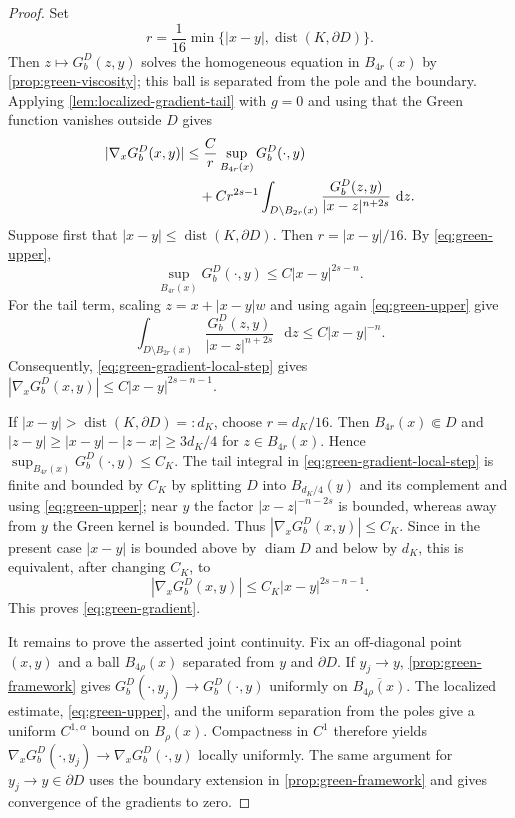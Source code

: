 \documentclass[10pt,a4paper]{amsart}
\numberwithin{equation}{section}
\newcommand{\differential}{\mathop{}\!\mathrm d}
\newcommand{\rev}[1]{#1}
\begin{document}
\begin{proof}
\rev{Set
\[
 r=\frac1{16}\min\{|x-y|,\operatorname{dist}(K,\partial D)\}.
\]
Then $z\mapsto G_b^D(z,y)$ solves the homogeneous equation in
$B_{4r}(x)$ by \cref{prop:green-viscosity}; this ball is separated from
the pole and the boundary.}  Applying \cref{lem:localized-gradient-tail} with $g=0$ and
using that the Green function vanishes outside $D$ gives
\begin{align}\label{eq:green-gradient-local-step}
 |\nabla_xG_b^D(x,y)|
 &\le \frac{C}{r}\sup_{B_{4r}(x)}G_b^D(\cdot,y)\notag\\
 &\quad+C r^{2s-1}
 \int_{D\setminus B_{2r}(x)}
 \frac{G_b^D(z,y)}{|x-z|^{n+2s}}\,\differential z.
\end{align}
Suppose first that $|x-y|\le\operatorname{dist}(K,\partial D)$.  Then
\rev{$r=|x-y|/16$}.  By \eqref{eq:green-upper},
\[
 \sup_{B_{4r}(x)}G_b^D(\cdot,y)\le C|x-y|^{2s-n}.
\]
For the tail term, scaling $z=x+|x-y|w$ and using again
\eqref{eq:green-upper} give
\[
 \int_{D\setminus B_{2r}(x)}
 \frac{G_b^D(z,y)}{|x-z|^{n+2s}}\,\differential z
 \le C|x-y|^{-n}.
\]
Consequently, \eqref{eq:green-gradient-local-step} gives
$|\nabla_xG_b^D(x,y)|\le C|x-y|^{2s-n-1}$.

If $|x-y|>\operatorname{dist}(K,\partial D)=:d_K$, choose
\rev{$r=d_K/16$}.  \rev{Then $B_{4r}(x)\Subset D$ and
$|z-y|\ge |x-y|-|z-x|\ge3d_K/4$ for $z\in B_{4r}(x)$.}  Hence
$\sup_{B_{4r}(x)}G_b^D(\cdot,y)\le C_K$.  The tail integral in
\eqref{eq:green-gradient-local-step} is finite and bounded by $C_K$ by
splitting $D$ into $B_{d_K/4}(y)$ and its complement and using
\eqref{eq:green-upper}; near $y$ the factor $|x-z|^{-n-2s}$ is bounded,
whereas away from $y$ the Green kernel is bounded.  Thus
$|\nabla_xG_b^D(x,y)|\le C_K$.  Since in the present case
$|x-y|$ is bounded above by $\operatorname{diam}D$ and below by $d_K$,
this is equivalent, after changing $C_K$, to
\[
 |\nabla_xG_b^D(x,y)|\le C_K|x-y|^{2s-n-1}.
\]
This proves
\eqref{eq:green-gradient}.

\rev{It remains to prove the asserted joint continuity.  Fix an
off-diagonal point $(x,y)$ and a ball $B_{4\rho}(x)$ separated from $y$ and
$\partial D$.  If $y_j\to y$, \cref{prop:green-framework} gives
$G_b^D(\cdot,y_j)\to G_b^D(\cdot,y)$ uniformly on
$\overline{B_{4\rho}(x)}$.  The localized estimate, \eqref{eq:green-upper},
and the uniform separation from the poles give a uniform
$C^{1,\alpha}$ bound on $B_\rho(x)$.  Compactness in $C^1$ therefore yields
$\nabla_xG_b^D(\cdot,y_j)\to\nabla_xG_b^D(\cdot,y)$ locally uniformly.
The same argument for $y_j\to y\in\partial D$ uses the boundary extension
in \cref{prop:green-framework} and gives convergence of the gradients to
zero.}
\end{proof}
\end{document}
